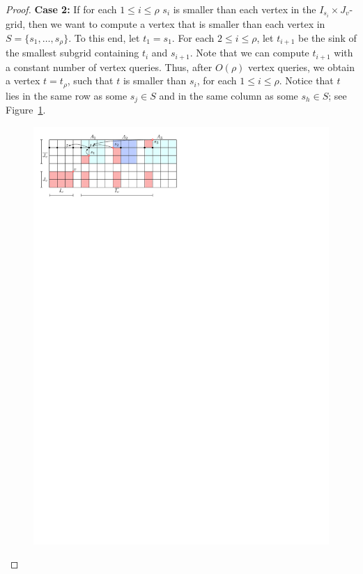 \documentclass[a4paper,10pt]{article}
\begin{document}
\begin{proof}
\textbf{Case 2:} If for each $1\leq i\leq \rho$ $s_i$ is smaller than each vertex in the $I_{s_i}\times J_v$-grid, then we want to compute a vertex that is smaller than each vertex in $S = \{s_1, \ldots, s_\rho\}$.
To this end, let $t_1 = s_1$.
For each $2\leq i\leq \rho$, let $t_{i+1}$ be the sink of the smallest subgrid containing $t_i$ and $s_{i+1}$. Note that we can compute $t_{i+1}$ with a constant number of vertex queries.
Thus, after $O(\rho)$ vertex queries, we obtain a vertex $t = t_\rho$, such that $t$ is smaller than $s_i$, for each $1\leq i\leq \rho$. Notice that $t$ lies in the same row as some $s_j\in S$ and in the same column as some $s_h\in S$; see Figure~\ref{fig:Expansion Case 2}. 

\begin{figure}[h]
\centering
\includegraphics{expansion_lemma_fig2.pdf}
\caption{\small }
\label{fig:Expansion Case 2}
\end{figure}


\end{proof}
\end{document}
